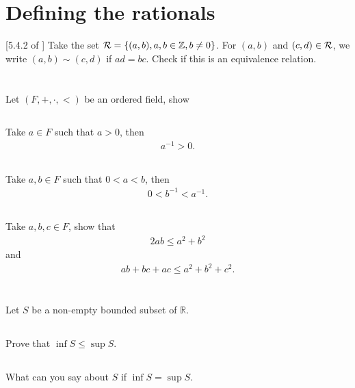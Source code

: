 \documentclass[11pt,letterpaper]{article}
\begin{document}
\section{Defining the rationals}
[5.4.2 of \cite{Hajlasz_18}] Take the set $\mathcal{R} = \{(a,b), a,b\in\mathbb{Z}, b\neq 0\}$. For $(a,b)$ and $(c,d)\in\mathcal{R}$, we write $(a,b)\sim(c,d)$ if $ad=bc$. Check if this is an equivalence relation.

\section{}
Let $(F,+,\cdot,<)$ be an ordered field, show

\subsection{}
Take $a\in F$ such that $a>0$, then 
\begin{align}
    a^{-1}>0.
\end{align}

\subsection{}
Take $a,b\in F$ such that $0<a<b$, then 
\begin{align}
    0<b^{-1}<a^{-1}.
\end{align}

\subsection{}
Take $a,b,c\in F$, show that 
\begin{align}
    2ab \leq a^2+b^2
\end{align}
and
\begin{align}
    ab+bc+ac \leq a^2+b^2+c^2.
\end{align} 

\section{}
Let $S$ be a non-empty bounded subset of $\mathbb{R}$.
\subsection{} Prove that $\inf S\leq \sup S$.
\subsection{} What can you say about $S$ if $\inf S= \sup S$.
\end{document}
